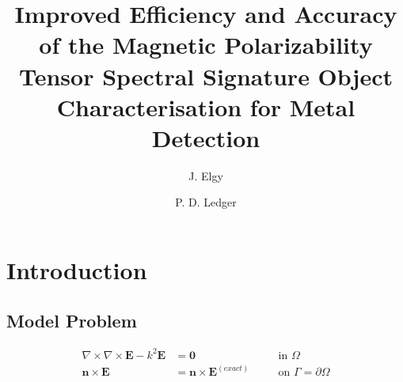 \documentclass[a4paper,12]{elsarticle}
\theoremstyle{definition}
\newcommand{\curl}{\nabla \times}
\begin{document}

\begin{frontmatter}

\title{Improved Efficiency and Accuracy of the Magnetic Polarizability Tensor Spectral Signature Object Characterisation for Metal Detection}
%
\cortext[cor1]{*}
 
\author[1]{J. Elgy} 
\author[1]{P. D. Ledger} 


\begin{abstract}

\end{abstract}

\begin{keyword} 
\end{keyword}

\end{frontmatter}

\section{Introduction}\label{sect:intro}

\subsection{Model Problem}
\begin{equation}
\begin{alignedat}{2}
\curl \curl \boldsymbol{E} - k^2\boldsymbol{E} &= \boldsymbol{0} &&\quad \text{in } \Omega \\
\boldsymbol{n} \times \boldsymbol{E} &= \boldsymbol{n} \times \boldsymbol{E}^{(exact)} &&\quad \text{on } \Gamma = \partial \Omega
\end{alignedat}
\end{equation}
\end{document}
